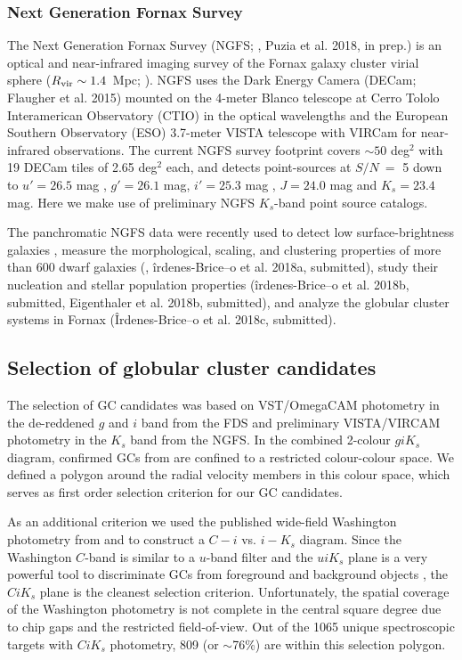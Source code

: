 \documentclass[usenatbib]{mnras}
\begin{document}
\subsubsection{Next Generation Fornax Survey}
\label{sec:NGFS}
The Next Generation Fornax Survey (NGFS; \citealt{munoz15}, Puzia et al. 2018, in prep.) 
is an optical and near-infrared imaging survey of the Fornax
galaxy cluster virial sphere ($R_{\rm vir}\sim 1.4$~Mpc; \citealt{Drinkwater+01}). 
NGFS uses the Dark Energy Camera (DECam; Flaugher et al. 2015) mounted on the 
4-meter Blanco telescope at Cerro Tololo Interamerican Observatory (CTIO) in the 
optical wavelengths and the European Southern Observatory (ESO) 3.7-meter VISTA 
telescope with VIRCam \citep{sutherland15} for near-infrared observations. 
The current NGFS survey footprint covers $\sim50$ deg$^2$ with 19 DECam tiles of 2.65 
deg$^2$ each, and detects point-sources at $S/N\ =$ 5 down to $u'= 26.5$ mag , $g'= 26.1$ mag, 
$i'= 25.3$ mag , $J = 24.0$ mag and $K_s = 23.4$ mag. Here we make use of preliminary NGFS 
$K_s$-band point source catalogs.

The panchromatic NGFS data were recently used to detect low surface-brightness 
galaxies \citep{munoz15}, measure the morphological, scaling, and clustering 
properties of more than 600 dwarf galaxies (\citealt{Eigenthaler18}, îrdenes-Brice–o 
et al. 2018a, submitted), study their nucleation and stellar population properties 
(îrdenes-Brice–o et al. 2018b, submitted, Eigenthaler et al. 2018b, submitted), 
and analyze the globular cluster systems in Fornax ({\^I}rdenes-Brice–o et al. 2018c, submitted). 

\subsection{Selection of globular cluster candidates}
\label{sec:selectionGC}
The selection of GC candidates was based on VST/OmegaCAM photometry in the de-reddened $g$ 
and $i$ band from the FDS \citep{DAbrusco16,Iodice16} and preliminary 
VISTA/VIRCAM photometry in the $K_s$ band from the NGFS. 
In the combined 2-colour $g i K_s$ diagram, confirmed GCs from \citet{Schuberth}
are confined to a restricted colour-colour space. We defined a polygon around 
the radial velocity members in this colour space, which serves as first order 
selection criterion for our GC candidates. 

As an additional criterion we used the published wide-field Washington 
photometry from \citet{Dirsch04} and \citet{Bassino} to construct a $C-i$ vs. 
$i-K_s$ diagram. Since the Washington $C$-band is similar to a $u$-band filter 
and the $uiK_s$ plane is a very powerful tool to discriminate GCs from 
foreground and background objects \citep{Munoz14}, the $CiK_s$ plane is the 
cleanest selection criterion. Unfortunately, the spatial coverage of the 
Washington photometry is not complete in the central square degree due to chip 
gaps and the restricted field-of-view. Out of the 1065 unique spectroscopic 
targets with $CiK_s$ photometry, 809 (or $\sim$76\%) are within this selection 
polygon.
\end{document}
